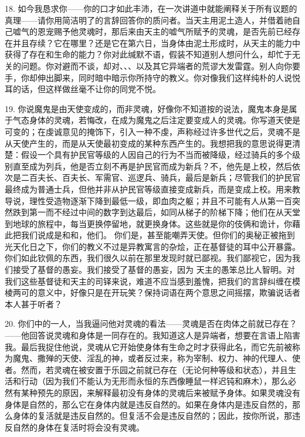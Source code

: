 18. 如今我恳求你——你的口才如此丰沛，在一次讲道中就能阐释关于所有议题的真理——请你用简洁明了的言辞回答你的质问者。当天主用泥土造人，并借着祂自己嘘气的恩宠赐予他灵魂时，那后来由天主的嘘气所赋予的灵魂，是否先前已经存在并且存续？它在哪里？还是它在第六日，当身体由泥土形成时，从天主的能力中获得了存在和生命的能力？你对此缄默不语，假装不知道别人想问什么，却忙于无关的问题。你对避而不谈，却对、、、以及其它异端者的荒谬大发雷霆。别人向你要手，你却伸出脚来，同时暗中暗示你所持守的教义。你对像我们这样纯朴的人说悦耳的话，但这样做丝毫不让你的同党不悦。\par

19. 你说魔鬼是由天使变成的，而非灵魂，好像你不知道按的说法，魔鬼本身是属于气态身体的灵魂，若悔改，在成为魔鬼之后注定要变成人的灵魂。你写道天使是可变的；在虔诚意见的掩饰下，引入一种不虔，声称经过许多世代之后，灵魂不是从天使产生的，而是从天使最初变成的某种东西产生的。我想把我的意思说得更清楚：假设一个具有护民官等级的人因自己的行为不当而被降级，经过骑兵的多个级别直至成为列兵，他是否立刻不再是护民官而成为新兵？不，他先是上校，然后依次是二百夫长、百夫长、军需官、巡逻兵、骑兵，最后是新兵；尽管我们的护民官最终成为普通士兵，但他并非从护民官等级直接变成新兵，而是变成上校。用来教导说，理性受造物逐渐下降到最低一级，即血肉之躯；并且不可能有人从第一百突然跌到第一而不经过中间的数字到达最后，如同从梯子的阶梯下降；他们在从天堂到地球的旅程中，每当更换停留地，就更换身体。这些就是你的伎俩和诡计，你藉此把我们说成是和和，他们。 你们是，甚至能嘲弄天使。但你们的奥秘正被拖到光天化日之下，你们的教义不过是异教寓言的杂烩，正在基督徒的耳中公开暴露。你们如此钦佩的东西，我们很久以前在那里发现时就已鄙视。我们鄙视它，因为我们接受了基督的愚妄。我们接受了基督的愚妄，因为 天主的愚笨总比人智明。对我们这些基督徒和天主的司铎来说，难道不应当感到羞愧，把我们的言辞纠缠在模棱两可的意义中，好像只是在开玩笑？保持词语在两个意思之间摇摆，欺骗说话者本人甚于听者？\par

20. 你们中的一人，当我逼问他对灵魂的看法——灵魂是否在肉体之前就已存在？——他回答说灵魂和身体是一同存在的。我知道这人是异端者，想要在言语上陷害我。最后我捉住他说，灵魂从它开始使身体有生命之时才获得此名，而它先前被称为魔鬼、撒殚的天使、淫乱的神，或者反过来，称为宰制、权力、神的代理人、使者。然而，若灵魂在被安置于乐园之前就已存在（无论何种等级和状态），并且生活和行动（因为我们不能认为无形而永恒的东西像睡鼠一样迟钝和麻木），那么必然有某种预先的原因，来解释最初没有身体的灵魂后来被赋予身体。如果灵魂没有身体是自然的，那么它在身体内就是违反自然的。如果在身体内是违反自然的，那么身体的复活就是违反自然的。但复活不会是违反自然的；因此，按你所说，那违反自然的身体在复活时将会没有灵魂。\par

